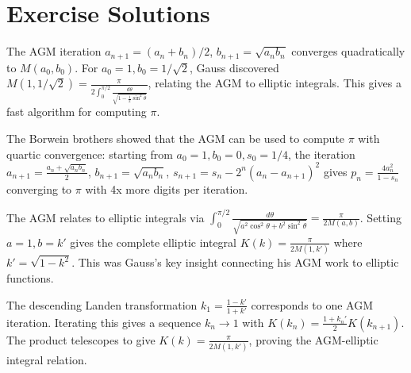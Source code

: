 \section{Exercise Solutions}

\begin{solution}
The AGM iteration $a_{n+1} = (a_n+b_n)/2$, $b_{n+1} = \sqrt{a_n b_n}$ converges quadratically to $M(a_0, b_0)$. For $a_0 = 1, b_0 = 1/\sqrt{2}$, Gauss discovered $M(1, 1/\sqrt{2}) = \frac{\pi}{2\int_0^{\pi/2}\frac{d\theta}{\sqrt{1-\frac{1}{2}\sin^2\theta}}}$, relating the AGM to elliptic integrals. This gives a fast algorithm for computing $\pi$.
\end{solution}

\begin{solution}
The Borwein brothers showed that the AGM can be used to compute $\pi$ with quartic convergence: starting from $a_0 = 1, b_0 = 0, s_0 = 1/4$, the iteration $a_{n+1} = \frac{a_n+\sqrt{a_n b_n}}{2}$, $b_{n+1} = \sqrt{a_n b_n}$, $s_{n+1} = s_n - 2^n(a_n - a_{n+1})^2$ gives $p_n = \frac{4a_n^2}{1-s_n}$ converging to $\pi$ with 4x more digits per iteration.
\end{solution}

\begin{solution}
The AGM relates to elliptic integrals via $\int_0^{\pi/2}\frac{d\theta}{\sqrt{a^2\cos^2\theta + b^2\sin^2\theta}} = \frac{\pi}{2M(a,b)}$. Setting $a = 1, b = k'$ gives the complete elliptic integral $K(k) = \frac{\pi}{2M(1,k')}$ where $k' = \sqrt{1-k^2}$. This was Gauss's key insight connecting his AGM work to elliptic functions.
\end{solution}

\begin{solution}
The descending Landen transformation $k_1 = \frac{1-k'}{1+k'}$ corresponds to one AGM iteration. Iterating this gives a sequence $k_n \to 1$ with $K(k_n) = \frac{1+k_n'}{2}K(k_{n+1})$. The product telescopes to give $K(k) = \frac{\pi}{2M(1,k')}$, proving the AGM-elliptic integral relation.
\end{solution}
